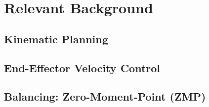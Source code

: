 			
			
			
			
			
			

		
	\section{Relevant Background}\label{sec:background}
    		
    	
		\subsection{Kinematic Planning}
			
		\subsection{End-Effector Velocity Control}
			
%			
		\subsection{Balancing: Zero-Moment-Point (ZMP)}
			
	

